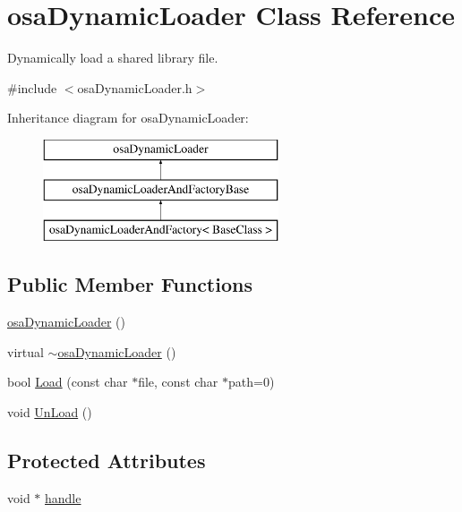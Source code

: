 \hypertarget{classosa_dynamic_loader}{}\section{osa\+Dynamic\+Loader Class Reference}
\label{classosa_dynamic_loader}


Dynamically load a shared library file.  




{\ttfamily \#include $<$osa\+Dynamic\+Loader.\+h$>$}

Inheritance diagram for osa\+Dynamic\+Loader\+:\begin{figure}[H]
\begin{center}
\leavevmode
\includegraphics[height=3.000000cm]{d0/d64/classosa_dynamic_loader}
\end{center}
\end{figure}
\subsection*{Public Member Functions}
\begin{DoxyCompactItemize}
\item 
\hyperlink{classosa_dynamic_loader_aa4236a44f81ed4c9c6574de805819f39}{osa\+Dynamic\+Loader} ()
\item 
virtual \hyperlink{classosa_dynamic_loader_ac65cff54806c2d304f018cb04938298c}{$\sim$osa\+Dynamic\+Loader} ()
\item 
bool \hyperlink{classosa_dynamic_loader_a1a09c14de452798d15c2a7647c604fa7}{Load} (const char $\ast$file, const char $\ast$path=0)
\item 
void \hyperlink{classosa_dynamic_loader_ae1bc384582b840846f81768a7c1adbed}{Un\+Load} ()
\end{DoxyCompactItemize}
\subsection*{Protected Attributes}
\begin{DoxyCompactItemize}
\item 
void $\ast$ \hyperlink{classosa_dynamic_loader_aeee1ea1770407bfd73e49f3fb822d7ac}{handle}
\end{DoxyCompactItemize}


